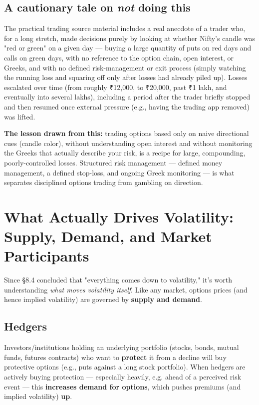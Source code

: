 \documentclass[12pt,openany]{book}
\theoremstyle{definition}
\theoremstyle{remark}
\begin{document}
\subsection{A cautionary tale on \emph{not} doing this}

The practical trading source material includes a real anecdote of a trader who, for a long stretch, made decisions purely by looking at whether Nifty's candle was "red or green" on a given day — buying a large quantity of puts on red days and calls on green days, with no reference to the option chain, open interest, or Greeks, and with no defined risk-management or exit process (simply watching the running loss and squaring off only after losses had already piled up). Losses escalated over time (from roughly ₹12,000, to ₹20,000, past ₹1 lakh, and eventually into several lakhs), including a period after the trader briefly stopped and then resumed once external pressure (e.g., having the trading app removed) was lifted.

\textbf{The lesson drawn from this:} trading options based only on naive directional cues (candle color), without understanding open interest and without monitoring the Greeks that actually describe your risk, is a recipe for large, compounding, poorly-controlled losses. Structured risk management — defined money management, a defined stop-loss, and ongoing Greek monitoring — is what separates disciplined options trading from gambling on direction.


\section{What Actually Drives Volatility: Supply, Demand, and Market Participants}

Since \S{}8.4 concluded that "everything comes down to volatility," it's worth understanding \emph{what moves volatility itself}. Like any market, options prices (and hence implied volatility) are governed by \textbf{supply and demand}.

\subsection{Hedgers}

Investors/institutions holding an underlying portfolio (stocks, bonds, mutual funds, futures contracts) who want to \textbf{protect} it from a decline will buy protective options (e.g., puts against a long stock portfolio). When hedgers are actively buying protection — especially heavily, e.g. ahead of a perceived risk event — this \textbf{increases demand for options}, which pushes premiums (and implied volatility) \textbf{up}.
\end{document}
